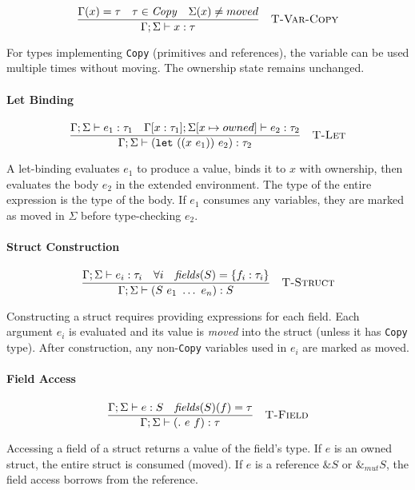 \documentclass[11pt,a4paper,twoside]{book}
\begin{document}
\[
\frac{
  \Gamma(x) = \tau \quad \tau \in \mathit{Copy} \quad \Sigma(x) \neq moved
}{
  \Gamma ; \Sigma \vdash x : \tau
}
\quad \textsc{T-Var-Copy}
\]

For types implementing \texttt{Copy} (primitives and references), the variable
can be used multiple times without moving. The ownership state remains unchanged.

\paragraph{Let Binding}

\[
\frac{
  \Gamma ; \Sigma \vdash e_1 : \tau_1 \quad
  \Gamma[x:\tau_1] ; \Sigma[x \mapsto owned] \vdash e_2 : \tau_2
}{
  \Gamma ; \Sigma \vdash (\mathtt{let}\ ((x\ e_1))\ e_2) : \tau_2
}
\quad \textsc{T-Let}
\]

A let-binding evaluates $e_1$ to produce a value, binds it to $x$ with ownership,
then evaluates the body $e_2$ in the extended environment. The type of the entire
expression is the type of the body. If $e_1$ consumes any variables, they are
marked as moved in $\Sigma$ before type-checking $e_2$.

\paragraph{Struct Construction}

\[
\frac{
  \Gamma ; \Sigma \vdash e_i : \tau_i \quad \forall i \quad
  \mathit{fields}(S) = \{f_i : \tau_i\}
}{
  \Gamma ; \Sigma \vdash (S\ e_1\ \dots\ e_n) : S
}
\quad \textsc{T-Struct}
\]

Constructing a struct requires providing expressions for each field. Each
argument $e_i$ is evaluated and its value is \emph{moved} into the struct (unless
it has \texttt{Copy} type). After construction, any non-\texttt{Copy} variables
used in $e_i$ are marked as moved.

\paragraph{Field Access}

\[
\frac{
  \Gamma ; \Sigma \vdash e : S \quad \mathit{fields}(S)(f) = \tau
}{
  \Gamma ; \Sigma \vdash (.~e~f) : \tau
}
\quad \textsc{T-Field}
\]

Accessing a field of a struct returns a value of the field's type. If $e$ is an
owned struct, the entire struct is consumed (moved). If $e$ is a reference
$\&S$ or $\&_{mut}S$, the field access borrows from the reference.
\end{document}
